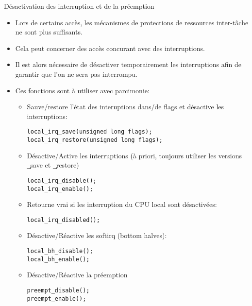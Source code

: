 \begin{frame}[fragile=singleslide]{Désactivation des interruption et de la préemption}
  \begin{itemize} 
  \item  Lors de  certains  accès, les  mécanismes  de protections  de
    ressources inter-tâche ne sont plus suffisants.
  \item   Cela   peut  concerner   des   accès   concurant  avec   des
    interruptions.
  \item  Il  est alors  nécessaire  de  désactiver temporairement  les
    interruptions afin de garantir que l'on ne sera pas interrompu.
  \item   Ces fonctions sont à utiliser avec parcimonie:
    \begin{itemize} 
    \item  Sauve/restore  l'état  des  interuptions dans/de  flags  et
      désactive les interruptions:
      \begin{lstlisting} 
local_irq_save(unsigned long flags);
local_irq_restore(unsigned long flags);
      \end{lstlisting} 
    \item  Désactive/Active  les  interruptions  (à  priori,  toujours
      utiliser les versions \c{_save} et \c{_restore})
      \begin{lstlisting} 
local_irq_disable();
local_irq_enable();
      \end{lstlisting} 
    \item  Retourne  vrai  si  les  interruption  du  CPU  local  sont
      désactivées:
      \begin{lstlisting} 
local_irq_disabled();
      \end{lstlisting} 
    \item Désactive/Réactive les softirq (bottom halves):
      \begin{lstlisting} 
local_bh_disable();
local_bh_enable();
      \end{lstlisting} 
    \item Désactive/Réactive la préemption
      \begin{lstlisting} 
preempt_disable();
preempt_enable();
      \end{lstlisting} 
    \end{itemize} 
  \end{itemize} 
\end{frame} 

